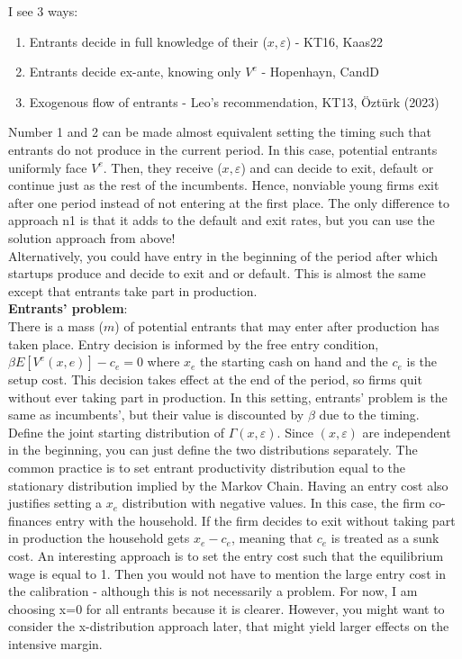 \documentclass[12pt]{article}
\begin{document}
I see 3 ways:
\begin{enumerate} \setlength\itemsep{0em}
    \item Entrants decide in full knowledge of their ($x, \varepsilon$) - KT16, Kaas22
    \item Entrants decide ex-ante, knowing only $V^e$ - Hopenhayn, CandD
    \item Exogenous flow of entrants - Leo's recommendation, KT13, Öztürk (2023)
\end{enumerate}
Number 1 and 2 can be made almost equivalent setting the timing such that entrants do not produce in the current period. In this case, potential entrants uniformly face $V^e$. Then, they receive ($x, \varepsilon$) and can decide to exit, default or continue just as the rest of the incumbents. Hence, nonviable young firms exit after one period instead of not entering at the first place. The only difference to approach n1 is that it adds to the default and exit rates, but you can use the solution approach from above! \vspace{3mm} \\
Alternatively, you could have entry in the beginning of the period after which startups produce and decide to exit and or default. This is almost the same except that entrants take part in production. \vspace{3mm} \\
\textbf{Entrants' problem}: \\
There is a mass ($m$) of potential entrants that may enter after production has taken place. Entry decision is informed by the free entry condition, $\beta E[V^e(x,e)] - c_e = 0$ where $x_e$ the starting cash on hand and the $c_e$ is the setup cost. This decision takes effect at the end of the period, so firms quit without ever taking part in production. In this setting, entrants' problem is the same as incumbents', but their value is discounted by $\beta$ due to the timing. \vspace{3mm} \\
Define the joint starting distribution of $\Gamma(x,\varepsilon)$. Since $(x,\varepsilon)$ are independent in the beginning, you can just define the two distributions separately. The common practice is to set entrant productivity distribution equal to the stationary distribution implied by the Markov Chain. Having an entry cost also justifies setting a $x_e$ distribution with negative values. In this case, the firm co-finances entry with the household. If the firm decides to exit without taking part in production the household gets $x_e - c_e$, meaning that $c_e$ is treated as a sunk cost. An interesting approach is to set the entry cost such that the equilibrium wage is equal to 1. Then you would not have to mention the large entry cost in the calibration - although this is not necessarily a problem. For now, I am choosing x=0 for all entrants because it is clearer. However, you might want to consider the x-distribution approach later, that might yield larger effects on the intensive margin. \vspace{3mm} \\
\end{document}

